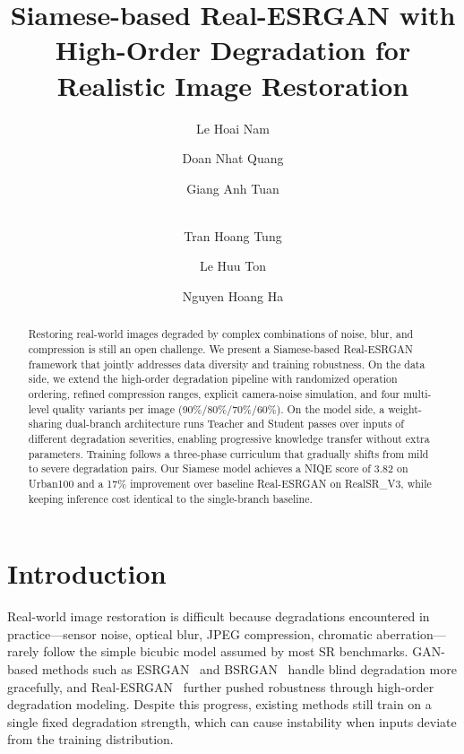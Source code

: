 \documentclass[runningheads]{llncs}
\begin{document}
\title{Siamese-based Real-ESRGAN with High-Order Degradation for Realistic Image Restoration}

\author{Le Hoai Nam \and Doan Nhat Quang \and Giang Anh Tuan \and\\
Tran Hoang Tung \and Le Huu Ton \and Nguyen Hoang Ha}



\maketitle

\begin{abstract}
Restoring real-world images degraded by complex combinations of noise, blur, and compression is still an open challenge. We present a Siamese-based Real-ESRGAN framework that jointly addresses data diversity and training robustness. On the data side, we extend the high-order degradation pipeline with randomized operation ordering, refined compression ranges, explicit camera-noise simulation, and four multi-level quality variants per image (90\%/80\%/70\%/60\%). On the model side, a weight-sharing dual-branch architecture runs Teacher and Student passes over inputs of different degradation severities, enabling progressive knowledge transfer without extra parameters. Training follows a three-phase curriculum that gradually shifts from mild to severe degradation pairs. Our Siamese model achieves a NIQE score of 3.82 on Urban100 and a 17\% improvement over baseline Real-ESRGAN on RealSR\_V3, while keeping inference cost identical to the single-branch baseline.
\end{abstract}


\section{Introduction}

Real-world image restoration is difficult because degradations encountered in practice—sensor noise, optical blur, JPEG compression, chromatic aberration—rarely follow the simple bicubic model assumed by most SR benchmarks. GAN-based methods such as ESRGAN~\cite{wang2018esrgan} and BSRGAN~\cite{zhang2021designing} handle blind degradation more gracefully, and Real-ESRGAN~\cite{wang2021realesrgan} further pushed robustness through high-order degradation modeling. Despite this progress, existing methods still train on a single fixed degradation strength, which can cause instability when inputs deviate from the training distribution.
\end{document}
